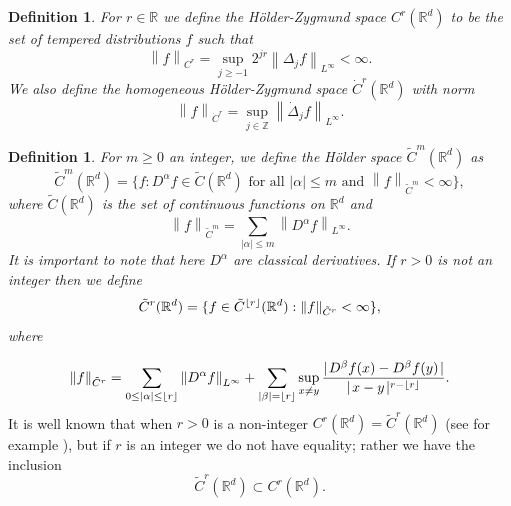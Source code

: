 \documentclass[12pt,xcolor=svgnames]{amsart}
\newtheorem{definition}[theorem]{Definition}
\newcommand{\R}{\mathbb{R}}
\newcommand{\abs}[1]{\mid\!#1\!\mid}
\newcommand{\norm}[2]{\left\lVert#1\right\rVert_{#2}}
\DeclarePairedDelimiter\floor{\lfloor}{\rfloor}
\begin{document}
 \begin{definition}
 \label{zygmund definition} For $r \in \mathbb{R}$ we define the Hölder-Zygmund space $C^r(\R^d)$ to be the set of tempered distributions $f$ such that
 $$
 \norm{f}{C^r} = \sup_{j \geq -1} 2^{jr}\norm{\Delta_j f}{L^{\infty}}<\infty.
 $$
 We also define the homogeneous Hölder-Zygmund space $\dot{C}^r(\R^d)$ with norm
 $$
 \norm{f}{\dot{C}^r} = \sup_{j \in \mathbb{Z}}\norm{\dot{\Delta}_jf}{L^{\infty}}.
 $$
\end{definition}
\begin{definition}
For $m\geq 0$ an integer, we define the Hölder space $\tilde{C}^m(\R^d)$ as
$$
\tilde{C}^m(\R^d) = \{f: D^{\alpha}f \in \tilde{C}(\R^d) \text{ for all } |\alpha| \leq m \text{ and } \norm{f}{\tilde{C}^m}<\infty\},$$
where $\tilde{C}(\R^d)$ is the set of continuous functions on $\R^d$ and 
$$
\norm{f}{\tilde{C}^m}=\sum_{|\alpha|\leq m} \norm{D^{\alpha}f}{L^{\infty}}.
$$
It is important to note that here $D^{\alpha}$ are classical derivatives. If $r>0$ is not an integer then we define 
 $$
 \tilde{C}^r(\R^d)=\{ f \in \tilde{C}^{\floor{r}}(\R^d): \norm{f}{\tilde{C}^r}<\infty\},
 $$ where
 \end{definition}
 \begin{equation}
\norm{f}{\tilde{C}^r} = \sum_{0 \leq |\alpha|\leq \floor{r}} \norm{D^{\alpha}f}{L^{\infty}} + \sum_{|\beta|=\floor{r}} \sup_{x \neq y} \frac{\abs{D^{\beta}f(x)-D^{\beta}f(y)}}{\abs{x-y}^{r-\floor{r}}}.
 \end{equation}
 It is well known that when $r>0$ is a non-integer $C^r(\R^d) = \tilde{C}^r(\R^d)$ (see for example \cite{3}), but if $r$ is an integer we do not have equality; rather we have the inclusion
 $$
\tilde{C}^r(\R^d) \subset C^r(\R^d).
$$
\end{document}
